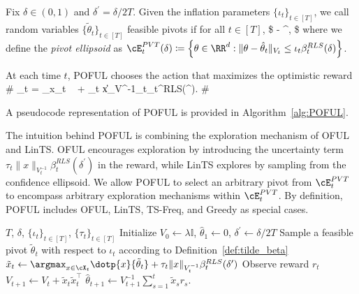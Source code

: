 \begin{definition} \label{def:tilde_beta}
Fix  $\delta \in (0,1)$ and  $\delta^\prime = \delta/2 T$. Given the inflation parameters $\{\iota_t\}_{t\in [T]}$, we call random variables $\{\tilde{\theta}_t\}_{t\in[T]}$  feasible pivots if for all $t\in[T]$,
\$
	\PP{}  - \delta^\prime,
	\$ where we define the \emph{pivot ellipsoid} as
$
 \cE_t^{\PVT} (\delta) \coloneqq \left \{\theta \in \RR^d: \|\theta - \hparam_t\|_{V_t}\leq \iota_t \beta^{RLS}_t (\delta ) \right\}$.
\end{definition}

At each time $t$, POFUL chooses the action that maximizes the optimistic reward \#\label{eq:POFUL}
_t = \argmax_{x\in\cX_t} \    +   \tau_t  \|x\|_{V^{-1}_t}\beta_t^{RLS}(\delta^\prime).
\#

A pseudocode representation of POFUL is provided in Algorithm~\ref{alg:POFUL}. 

The intuition behind POFUL is combining the exploration mechanism of OFUL and LinTS. OFUL encourages exploration by introducing the uncertainty term $\tau_t  \|x\|_{V^{-1}_t}\beta_t^{RLS}(\delta^\prime)$ in the reward, while LinTS explores by sampling from the confidence ellipsoid. We allow POFUL to select an arbitrary pivot from $\cE_t^{\PVT}$ to encompass arbitrary exploration mechanisms within $\cE_t^{\PVT}$.    By definition, POFUL includes OFUL, LinTS, TS-Freq, and Greedy as special cases.

\begin{algorithm}
	\caption{POFUL }\label{alg:POFUL}
	\begin{algorithmic}
		\REQUIRE $T$, $\delta$,  $\{\iota_t\}_{t\in [T]}$, $\{\tau_t\}_{t\in [T]}$
		\STATE Initialize $ V_{0} \leftarrow \lambda \mathbb{I}$, $\widehat{\theta}_{1} \leftarrow 0$,  $\delta^\prime \leftarrow \delta/2T$
		\STATE Sample a feasible pivot $\tilde{\theta}_{t} $ with respect to  $\iota_t$ according to Definition~\ref{def:tilde_beta}
		\STATE $\tilde{x}_{t} \leftarrow \argmax_{x\in\cX_t} \dotp{x}{\tilde{\theta}_{t}}  +   \tau_t  \|x\|_{V^{-1}_t}\beta_t^{RLS}(\delta^\prime)$
		\STATE Observe reward $r_{t}$
		\STATE $V_{t+1} \leftarrow V_{t}+\tilde{x}_{t}  \tilde{x}_{t}^{\top}$
		\STATE $\hat{\theta}_{t+1} \leftarrow V_{t+1}^{-1}\sum_{s=1}^{t} \tilde{x}_s r_{s}$.
		\ENDFOR
	\end{algorithmic}
\end{algorithm}







